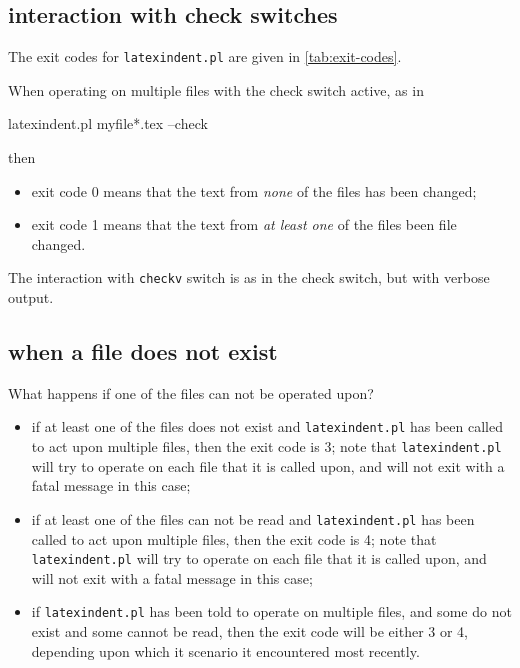  \subsection{interaction with check switches}
  The exit codes for \texttt{latexindent.pl} are given in \vref{tab:exit-codes}.

  When operating on multiple files with the check switch active, as in

  \begin{commandshell}
latexindent.pl myfile*.tex --check
        \end{commandshell}

  then
  \begin{itemize}
   \item exit code 0 means that the text from \emph{none} of the files has been changed;
   \item exit code 1 means that the text from \emph{at least one} of the files been file
         changed.
  \end{itemize}

  The interaction with \texttt{checkv} switch is as in the check switch, but with verbose
  output.

 \subsection{when a file does not exist}
  What happens if one of the files can not be operated upon?
  \begin{itemize}
   \item if at least one of the files does not exist and \texttt{latexindent.pl} has been
         called to act upon multiple files, then the exit code is 3; note that
         \texttt{latexindent.pl} will try to operate on each file that it is called upon,
         and will not exit with a fatal message in this case;
   \item if at least one of the files can not be read and \texttt{latexindent.pl} has
         been called to act upon multiple files, then the exit code is 4; note that
         \texttt{latexindent.pl} will try to operate on each file that it is called upon,
         and will not exit with a fatal message in this case;
   \item if \texttt{latexindent.pl} has been told to operate on multiple files, and some
         do not exist and some cannot be read, then the exit code will be either 3 or 4,
         depending upon which it scenario it encountered most recently.
  \end{itemize}

